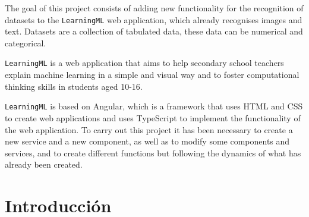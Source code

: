 \documentclass[a4paper, 12pt]{book}
\begin{document}
The goal of this project consists of adding new functionality for the recognition of datasets to the \texttt{LearningML} web application, which already recognises images and text. Datasets are a collection of tabulated data, these data can be numerical and categorical.

\texttt{LearningML} is a web application that aims to help secondary school teachers explain machine learning in a simple and visual way and to foster computational thinking skills in students aged 10-16.

\texttt{LearningML} is based on Angular, which is a framework that uses HTML and CSS to create web applications and uses TypeScript to implement the functionality of the web application. To carry out this project it has been necessary to create a new service and a new component, as well as to modify some components and services, and to create different functions but following the dynamics of what has already been created.




\tableofcontents 
\cleardoublepage
\listoffigures %



\cleardoublepage
\chapter{Introducción}
\label{sec:intro} %
\end{document}
